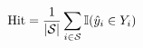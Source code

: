 \begin{equation}
        \text{Hit} = \frac{1}{|\mathcal{S}|} \sum_{i \in \mathcal{S}} \mathbb{I}(\hat{y}_i \in Y_i) \\[3pt]
\end{equation}